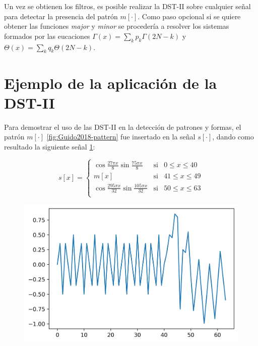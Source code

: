 Un vez se obtienen los filtros, es posible realizar la DST-II sobre cualquier señal para detectar la presencia
del patrón $m[\cdot]$. Como paso opcional si se quiere obtener las funciones \textit{major} y \textit{minor}
se procedería a resolver los sistemas formados por las eucaciones  $\Gamma(x)=\sum_k p_k \Gamma(2N-k)$ y 
$\Theta(x)=\sum_k q_k \Theta(2N-k)$.

\section{Ejemplo de la aplicación de la DST-II}

Para demostrar el uso de las DST-II en la detección de patrones y formas, el patrón $m[\cdot]$ \ref{fig:Guido2018-pattern} fue
insertado en la señal $s[\cdot]$, dando como resultado la siguiente señal \ref{fig:example-guido-signal}:

\begin{equation}
	s[x] = \left\{ \begin{array}{rcl}
			\cos{\frac{27\pi x}{8}}\sin{\frac{75\pi x}{8}} & \mbox{si} &  0\leq x \leq 40 \\
			m[x]    &    \mbox{si}     &     41\leq x \leq 49     \\
			\cos{\frac{295\pi x}{32}}\sin{\frac{105\pi x}{32}} & \mbox{si} &  50\leq x \leq 63 \\
					 \end{array}
	\right.
\end{equation}


\begin{figure}\label{fig:example-guido-signal}
	\centering
	\includegraphics[scale=0.8]{Graphics/example-guido-signal.png}
	\caption{}
\end{figure}


